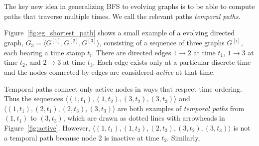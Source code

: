 \documentclass[11pt,conference,compsocconf]{IEEEtran}
\theoremstyle{definition}
\begin{document}
The key new idea in generalizing BFS to evolving graphs is to be able to compute
paths that traverse multiple times. We call the relevant paths
\textit{temporal paths}.

Figure~\ref{fig:eg_shortest_path} shows a small example of a evolving
directed graph, $G_3 = \langle G^{[1]}, G^{[2]}, G^{[3]}\rangle$, consisting of
a sequence of three graphs $G^{[i]}$, each bearing a time stamp $t_i$.
There are directed edges $1\rightarrow2$ at time $t_1$,
$1\rightarrow3$ at time $t_2$, and $2\rightarrow3$ at time $t_3$.
Each edge exists only at a particular discrete time and the nodes connected
by edges are considered \textit{active} at that time.

Temporal paths connect only active nodes in ways that respect time ordering.
Thus the sequences
$\langle (1, t_1), (1, t_2), (3, t_2), (3, t_3) \rangle$ and
$\langle (1, t_1), (2, t_1), (2, t_3), (3, t_3) \rangle$
are both examples of \textit{temporal paths} from $(1, t_1)$ to $(3, t_3)$,
which are drawn as dotted lines with arrowheads in Figure~\ref{fig:active}.
However, $\langle (1, t_1), (1, t_2), (2, t_2), (3, t_2), (3, t_3) \rangle$
is not a temporal path because node 2 is inactive at time $t_2$.
Similarly,
\end{document}
